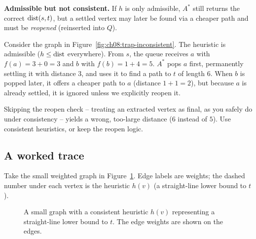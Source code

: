 \begin{trapbox}
\textbf{Admissible but not consistent.} If $h$ is only admissible, $A^*$ still
returns the correct $\operatorname{dist}(s,t)$, but a settled vertex may later be found via a
cheaper path and must be \emph{reopened} (reinserted into $Q$). 



Consider the graph in Figure~\ref{fig:ch08:trap-inconsistent}. The heuristic is admissible ($h \le \operatorname{dist}$ everywhere). From $s$, the queue receives $a$ with $f(a) = 3 + 0 = 3$ and $b$ with $f(b) = 1 + 4 = 5$. $A^*$ pops $a$ first, permanently settling it with distance $3$, and uses it to find a path to $t$ of length $6$. When $b$ is popped later, it offers a cheaper path to $a$ (distance $1+1=2$), but because $a$ is already settled, it is ignored unless we explicitly reopen it.

Skipping the reopen check -- treating an extracted vertex as final, as you safely do under
consistency -- yields a wrong, too-large distance ($6$ instead of $5$). Use consistent heuristics, or keep the
reopen logic.
\end{trapbox}

\subsection{A worked trace}
\label{ch08:astar-trace}

Take the small weighted graph in Figure~\ref{fig:ch08:astar-graph}. Edge labels are weights; the dashed number under
each vertex is the heuristic $h(v)$ (a straight-line lower bound to $t$).

\begin{figure}[htbp]
\centering
{}
\caption{A small graph with a consistent heuristic $h(v)$ representing a straight-line lower bound to $t$. The edge weights are shown on the edges.}
\label{fig:ch08:astar-graph}
\end{figure}

